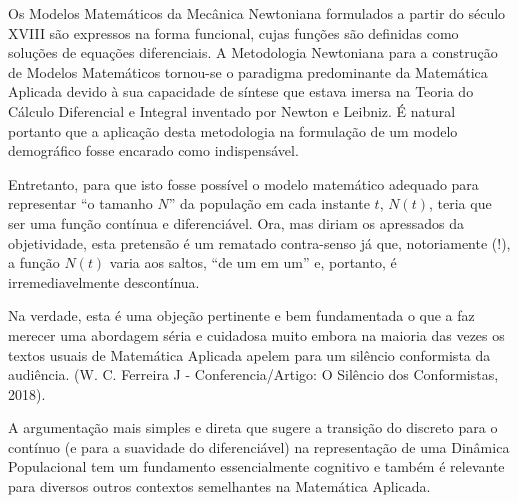     {\color{red} Os Modelos Matemáticos da Mecânica Newtoniana formulados a partir do século XVIII são expressos na forma funcional, cujas funções são definidas como soluções de equações diferenciais. A Metodologia Newtoniana para a construção de Modelos Matemáticos tornou-se o paradigma predominante da Matemática Aplicada devido à sua capacidade de síntese que estava imersa na Teoria do Cálculo Diferencial e Integral inventado por Newton e Leibniz. É natural portanto que a aplicação desta metodologia na formulação de um modelo demográfico fosse encarado como indispensável.

     Entretanto, para que isto fosse possível o modelo matemático adequado para representar ``o tamanho \(N\)'' da população em cada instante \(t\), \(N(t)\), teria que ser uma função contínua e diferenciável. Ora, mas diriam os apressados da objetividade, esta pretensão é um rematado contra-senso já que, notoriamente (!), a função \(N(t)\) varia aos saltos, ``de um em um'' e, portanto, é irremediavelmente descontínua.

    Na verdade, esta é uma objeção pertinente e bem fundamentada o que a faz merecer uma abordagem séria e cuidadosa muito embora na maioria das vezes os textos usuais de Matemática Aplicada apelem para um silêncio conformista da audiência. (W. C. Ferreira J - Conferencia/Artigo: O Silêncio dos Conformistas, 2018).

    A argumentação mais simples e direta que sugere a transição do discreto para o contínuo (e para a suavidade do diferenciável) na representação de uma Dinâmica Populacional tem um fundamento essencialmente cognitivo e também é relevante para diversos outros contextos semelhantes na Matemática Aplicada.

}
